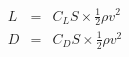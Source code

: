 \begin{align}
 L &=& C_L S \times \frac{1}{2} \rho v^2 \\
 D &=& C_D S \times \frac{1}{2} \rho v^2
 \end{align}
